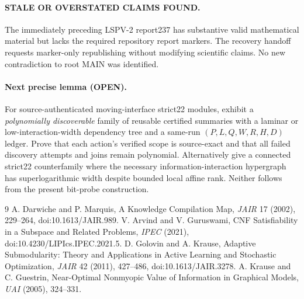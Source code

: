 \documentclass[11pt]{article}
\begin{document}
\paragraph{STALE OR OVERSTATED CLAIMS FOUND.} The immediately preceding LSPV-2 report237 has substantive valid mathematical material but lacks the required repository report markers. The recovery handoff requests marker-only republishing without modifying scientific claims. No new contradiction to root MAIN was identified.

\paragraph{Next precise lemma (OPEN).} For source-authenticated moving-interface strict22 modules, exhibit a \emph{polynomially discoverable} family of reusable certified summaries with a laminar or low-interaction-width dependency tree and a same-run $(P,L,Q,W,R,H,D)$ ledger. Prove that each action's verified scope is source-exact and that all failed discovery attempts and joins remain polynomial. Alternatively give a connected strict22 counterfamily where the necessary information-interaction hypergraph has superlogarithmic width despite bounded local affine rank. Neither follows from the present bit-probe construction.

\begin{thebibliography}{9}
 A. Darwiche and P. Marquis, A Knowledge Compilation Map, \emph{JAIR} 17 (2002), 229--264, doi:10.1613/JAIR.989.
 V. Arvind and V. Guruswami, CNF Satisfiability in a Subspace and Related Problems, \emph{IPEC} (2021), doi:10.4230/LIPIcs.IPEC.2021.5.
 D. Golovin and A. Krause, Adaptive Submodularity: Theory and Applications in Active Learning and Stochastic Optimization, \emph{JAIR} 42 (2011), 427--486, doi:10.1613/JAIR.3278.
 A. Krause and C. Guestrin, Near-Optimal Nonmyopic Value of Information in Graphical Models, \emph{UAI} (2005), 324--331.
\end{thebibliography}
\end{document}
